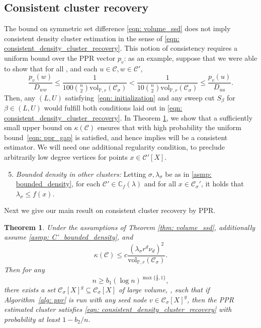 \documentclass[11pt,twoside]{article}
\newtheorem{theorem}{Theorem}
\theoremstyle{definition}
\newcommand{\vol}{\mathrm{vol}}
\newcommand{\1}{\mathbbm{1}}
\newcommand{\pbf}{p}        %
\newcommand{\Xbf}{X}
\newcommand{\Pbb}{\mathbb{P}}
\newcommand{\Cbb}{\mathbb{C}}
\newcommand{\Cset}{\mathcal{C}}
\newcommand{\Csig}{\Cset_{\sigma}}
\newcommand{\Cest}{\widehat{C}}
\begin{document}
\subsection{Consistent cluster recovery}

The bound on symmetric set difference \eqref{eqn: volume_ssd} does not imply 
consistent density cluster estimation in the sense of \eqref{eqn:
  consistent_density_cluster_recovery}. This notion of consistency requires a
uniform bound over the PPR vector $\pbf_v$: as an example, suppose that we were
able to show that for all \smash{$\Cset' \in \Cbb_f(\lambda), \Cset' \neq
  \Cset$}, and each $u \in \Cset, w \in \Cset'$,  
\begin{equation}
\label{eqn: ppr_gap}
\frac{\pbf_v(w)}{D_{ww}} \leq \frac{1}{100 {n \choose 2} \vol_{\Pbb,r}(\Csig)} <
\frac{1}{10 {n \choose 2} \vol_{\Pbb,r}(\Csig)} \leq \frac{\pbf_v(u)}{D_{uu}}. 
\end{equation}
Then, any $(L,U)$ satisfying~\eqref{eqn: initialization} and any sweep cut
$S_{\beta}$ for $\beta \in (L,U)$ would fulfill both conditions laid out in
\eqref{eqn: consistent_density_cluster_recovery}. In Theorem 
\ref{thm: consistent_recovery_of_density_clusters}, we show that a sufficiently 
small upper bound on $\kappa(\Cset)$ ensures that with high probability the
uniform bound~\eqref{eqn: ppr_gap} is satisfied, and hence implies
\smash{$\Cest$} will be a consistent  estimator. We will need one additional 
regularity condition, to preclude arbitrarily low degree vertices for points $x
\in \Cset'[\Xbf]$.  

\begin{enumerate}[label=(A\arabic*)]
  \setcounter{enumi}{4}
\item 
  \label{asmp: C'_bounded_density}
  \emph{Bounded density in other clusters:} Letting $\sigma,\lambda_{\sigma}$ be   
  as in \ref{asmp: bounded_density}, for each $\Cset' \in \Cbb_f(\lambda)$ and
  for all $x \in \Csig'$, it holds that $\lambda_{\sigma} \leq f(x)$. 
\end{enumerate}

Next we give our main result on consistent cluster recovery by PPR.

\begin{theorem}
  \label{thm: consistent_recovery_of_density_clusters}
  Under the assumptions of Theorem \ref{thm: volume_ssd}, additionally assume 
  \ref{asmp: C'_bounded_density}, and 
  \begin{equation}
    \label{eqn: kappa_ub}
    \kappa(\Cset) \leq c \frac{(\lambda_{\sigma} r^d
      \nu_d)^2}{\vol_{\Pbb,r}(\Csig)}.
  \end{equation}
  Then for any
  $$
  n \geq b_1 (\log n)^{\max\{\frac{3}{d},1\}},
  $$
  there exists a set $\Csig[\Xbf]^g \subseteq \Csig[\Xbf]$ of large volume, 
  \smash{$\vol_{n,r}(\Csig[\Xbf]^g) \geq
    \vol_{n,r}(\Csig[\Xbf])/2$}, such that if Algorithm~\ref{alg:
    ppr} is run with any seed node $v \in \Csig[\Xbf]^g$, then the PPR estimated cluster \smash{$\Cest$} satisfies \eqref{eqn: consistent_density_cluster_recovery} with probability at least $1-b_2/n$.
\end{theorem}
\end{document}

